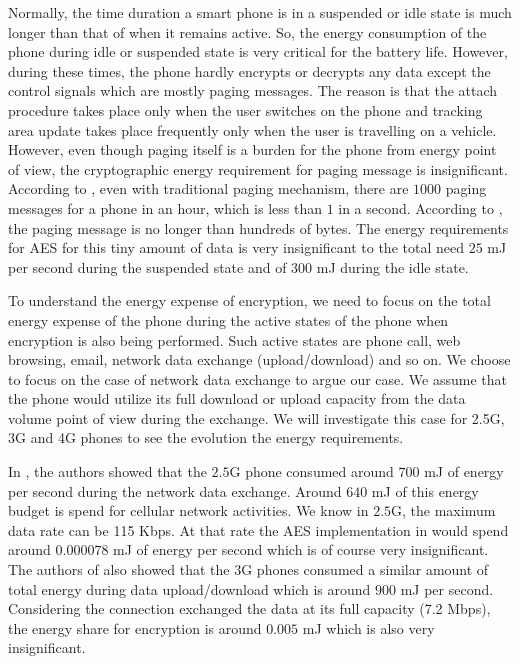 \documentclass[12pt]{llncs}
\begin{document}
Normally, the time duration a smart phone is in a suspended or idle state is much longer than that of when it remains active. So, the energy consumption of the phone during idle or suspended state is very critical for the battery life. However, during these times, the phone hardly encrypts or decrypts any data except the control signals which are mostly paging messages. The reason is that the attach procedure takes place only when the user switches on the phone and tracking area update takes place frequently only when the user is travelling on a vehicle. However, even though paging itself is a burden for the phone from energy point of view, the cryptographic energy requirement for paging message is insignificant. According to \cite{Nokia_2013}, even with traditional paging mechanism, there are $1000$ paging messages for a phone in an hour, which is less than $1$ in a second. According to \cite{3GPP_TS_36_331}, the paging message is no longer than hundreds of bytes. The energy requirements for AES for this tiny amount of data is very insignificant to the total need $25$ mJ per second during the suspended state and of 300 mJ during the idle state.

To understand the energy expense of encryption, we need to focus on the total energy expense of the phone during the active states of the phone when encryption is also being performed. Such active states are phone call, web browsing, email, network data exchange (upload/download) and so on. We choose to focus on the case of network data exchange to argue our case. We assume that the phone would utilize its full download or upload capacity from the data volume point of view during the exchange. We will investigate this case for 2.5G, 3G and 4G phones to see the evolution the energy requirements.

In \cite{Usenix_2010}, the authors showed that the $2.5$G phone consumed around $700$ mJ of energy per second during the network data exchange. Around $640$ mJ of this energy budget is spend for cellular network activities. We know in $2.5$G, the maximum data rate can be 115 Kbps. At that rate the AES implementation in \cite{Ruhr_2009} would spend around $0.000078$ mJ of energy per second which is of course very insignificant. The authors of \cite{Usenix_2010} also showed that the 3G phones consumed a similar amount of total energy during data upload/download which is around $900$ mJ per second. Considering the connection exchanged the data at its full capacity (7.2 Mbps), the energy share for encryption is around $0.005$ mJ which is also very insignificant. 
\end{document}
